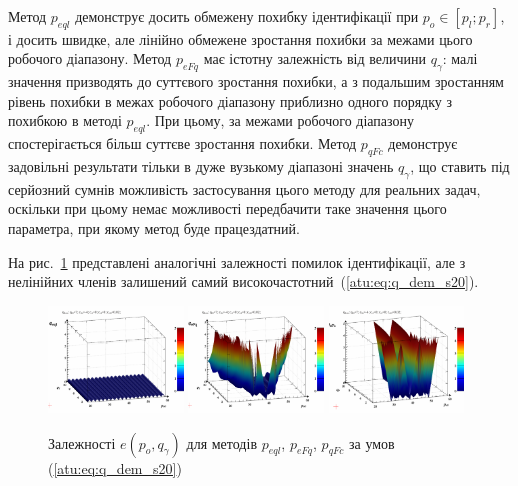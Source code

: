 Метод $p_{eql}$ демонструє досить обмежену похибку ідентифікації при
$p_o \in [p_l; p_r]$, і досить швидке, але лінійно обмежене зростання похибки за
межами цього робочого діапазону. Метод $p_{eFq}$ має істотну залежність
від величини $q_\gamma$: малі значення призводять до суттєвого
зростання похибки, а з подальшим зростанням рівень похибки в межах робочого
діапазону приблизно одного порядку з похибкою в методі $p_{eql}$. При
цьому, за межами робочого діапазону спостерігається більш суттєве зростання
похибки. Метод $p_{qFc}$ демонструє задовільні результати тільки в дуже
вузькому діапазоні значень $q_\gamma$, що ставить під серйозний сумнів
можливість застосування цього методу для реальних задач, оскільки при цьому
немає можливості передбачити таке значення цього параметра, при якому метод буде
працездатний.


На рис.~\ref{atu:f:qsl_pe_po_qg_s20} представлені аналогічні залежності
помилок ідентифікації, але з нелінійних членів залишений самий
високочастотний~(\ref{atu:eq:q_dem_s20}).

\begin{figure}[htb!]
  \begin{center}
    \includegraphics[width=0.32\textwidth]{p/qls_pe-p_po_qg_eql_s20.png}
    \hfill
    \includegraphics[width=0.32\textwidth]{p/qls_pe-p_po_qg_eFq_s20.png}
    \hfill
    \includegraphics[width=0.32\textwidth]{p/qls_pe-p_po_qg_eFc_s20.png}
  \end{center}
  \caption{Залежності $e(p_o,q_\gamma)$ для методів $p_{eql}$, $p_{eFq}$, $p_{qFc}$ за умов (\ref{atu:eq:q_dem_s20})}
  \label{atu:f:qsl_pe_po_qg_s20}
\end{figure}

